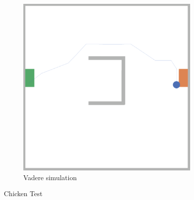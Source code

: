 \begin{figure}[H]
\begin{subfigure}[b]{0.3\textwidth}
     \includegraphics[width=\textwidth]{images/2-osm-chicken.png}
     \caption{Vadere simulation}
     \label{fig: chicken-vadere}
 \end{subfigure}
 \caption{Chicken Test}
\label{fig: chicken-task1}
\end{figure}